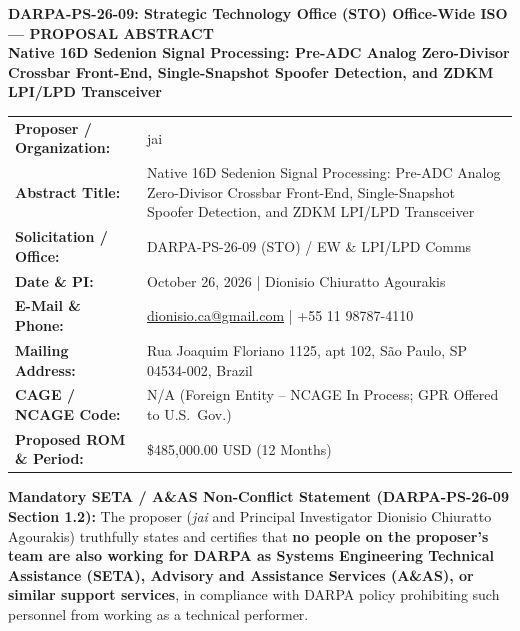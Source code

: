 \documentclass[12pt,letterpaper]{article}
\begin{document}
\thispagestyle{empty}
\vspace*{-12pt}
\begin{center}
    {\textbf{DARPA-PS-26-09: Strategic Technology Office (STO) Office-Wide ISO --- PROPOSAL ABSTRACT}}\\[2pt]
    {\large \textbf{Native 16D Sedenion Signal Processing: Pre-ADC Analog Zero-Divisor Crossbar Front-End, Single-Snapshot Spoofer Detection, and ZDKM LPI/LPD Transceiver}}\\[2pt]
\end{center}

\renewcommand{\arraystretch}{0.92}
\begin{tabular}{@{}p{2.0in}p{4.3in}@{}}
\toprule
\textbf{Proposer / Organization:} & jai \\
\textbf{Abstract Title:} & Native 16D Sedenion Signal Processing: Pre-ADC Analog Zero-Divisor Crossbar Front-End, Single-Snapshot Spoofer Detection, and ZDKM LPI/LPD Transceiver \\
\textbf{Solicitation / Office:} & DARPA-PS-26-09 (STO) / EW \& LPI/LPD Comms \\
\textbf{Date \& PI:} & October 26, 2026 \quad | \quad Dionisio Chiuratto Agourakis \\
\textbf{E-Mail \& Phone:} & \href{mailto:dionisio.ca@gmail.com}{dionisio.ca@gmail.com} \quad | \quad +55 11 98787-4110 \\
\textbf{Mailing Address:} & Rua Joaquim Floriano 1125, apt 102, S\~ao Paulo, SP 04534-002, Brazil \\
\textbf{CAGE / NCAGE Code:} & N/A (Foreign Entity -- NCAGE In Process; GPR Offered to U.S.\ Gov.) \\
\textbf{Proposed ROM \& Period:} & \$485,000.00 USD (12 Months) \\
\bottomrule
\end{tabular}
\renewcommand{\arraystretch}{1.0}

\vspace{2pt}
\textbf{Mandatory SETA / A\&AS Non-Conflict Statement (DARPA-PS-26-09 Section 1.2):}
The proposer (\textit{jai} and Principal Investigator Dionisio Chiuratto Agourakis) truthfully states and certifies that \textbf{no people on the proposer's team are also working for DARPA as Systems Engineering Technical Assistance (SETA), Advisory and Assistance Services (A\&AS), or similar support services}, in compliance with DARPA policy prohibiting such personnel from working as a technical performer.
\end{document}
